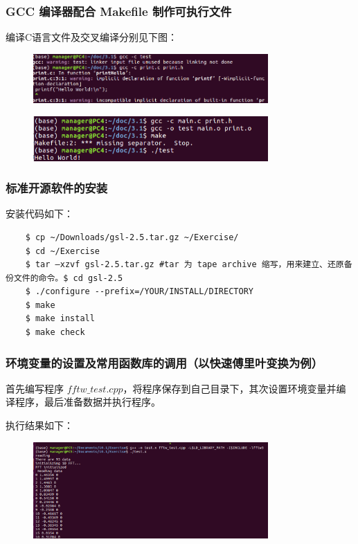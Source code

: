 \documentclass[10pt,a4paper,twoside,UTF8]{ctexart}
\begin{document}
\subsubsection{GCC 编译器配合 Makefile 制作可执行文件}
编译C语言文件及交叉编译分别见下图：
\begin{figure}[htbp]
	\centering
	\includegraphics[width=0.8\textwidth]{img//C_compile.png}
	\label{fig:Ccompile}
\end{figure}
\begin{figure}[htbp]
	\centering
	\includegraphics[width=0.8\textwidth]{img//crosscompile.png}
	\label{fig:crosscompile}
\end{figure}

\subsubsection{标准开源软件的安装}
安装代码如下：
\begin{lstlisting}
	$ cp ~/Downloads/gsl-2.5.tar.gz ~/Exercise/
	$ cd ~/Exercise
	$ tar –xzvf gsl-2.5.tar.gz #tar 为 tape archive 缩写，用来建立、还原备份文件的命令。$ cd gsl-2.5
	$ ./configure --prefix=/YOUR/INSTALL/DIRECTORY
	$ make
	$ make install
	$ make check
\end{lstlisting}

\subsubsection{环境变量的设置及常用函数库的调用（以快速傅里叶变换为例）}
首先编写程序 $fftw\_test.cpp$，将程序保存到自己目录下，其次设置环境变量并编译程序，最后准备数据并执行程序。

执行结果如下：
\begin{figure}[htbp]
	\centering
	\includegraphics[width=0.8\textwidth]{img//fft.png}
	\label{fig:fft}
\end{figure}
\end{document}
